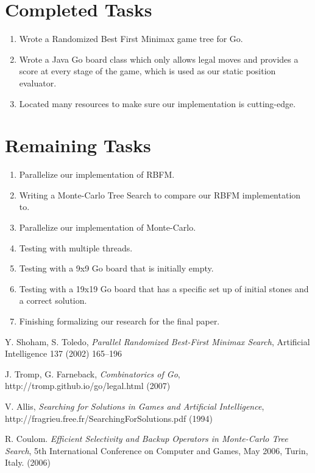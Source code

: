 \documentclass[conference]{IEEEtran}
\begin{document}
\section{Completed Tasks}
\begin{enumerate}
  \item Wrote a Randomized Best First Minimax game tree for Go.
  \item Wrote a Java Go board class which only allows legal moves and provides a score at every stage of the game, which is used as our static position evaluator.
  \item Located many resources to make sure our implementation is cutting-edge.
\end{enumerate}

\section{Remaining Tasks}
\begin{enumerate}
  \item Parallelize our implementation of RBFM.
  \item Writing a Monte-Carlo Tree Search to compare our RBFM implementation to.
  \item Parallelize our implementation of Monte-Carlo.
  \item Testing with multiple threads.
  \item Testing with a 9x9 Go board that is initially empty.
  \item Testing with a 19x19 Go board that has a specific  set up of initial stones and a correct solution.
  \item Finishing formalizing our research for the final paper.
\end{enumerate}

\begin{thebibliography}{1}

Y. Shoham, S. Toledo, \emph{Parallel Randomized Best-First Minimax Search},  Artificial Intelligence 137 (2002) 165--196

J. Tromp, G. Farneback, \emph{Combinatorics of Go},
http://tromp.github.io/go/legal.html (2007)

V. Allis, \emph{Searching for Solutions in Games and Artificial Intelligence},
http://fragrieu.free.fr/SearchingForSolutions.pdf (1994)

R. Coulom.  \emph{Efficient Selectivity and Backup Operators in Monte-Carlo Tree Search}, 5th International Conference on Computer and Games, May 2006, Turin, Italy. (2006)

\end{thebibliography}
\end{document}
